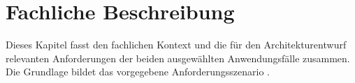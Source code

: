 \chapter{Fachliche Beschreibung}
\label{chap:fachliche-beschreibung}
\label{chap:unternehmen}

Dieses Kapitel fasst den fachlichen Kontext und die für den Architekturentwurf
relevanten Anforderungen der beiden ausgewählten Anwendungsfälle zusammen. Die
Grundlage bildet das vorgegebene Anforderungsszenario
\citep{nordakademieSzenarioVersicherung}.





